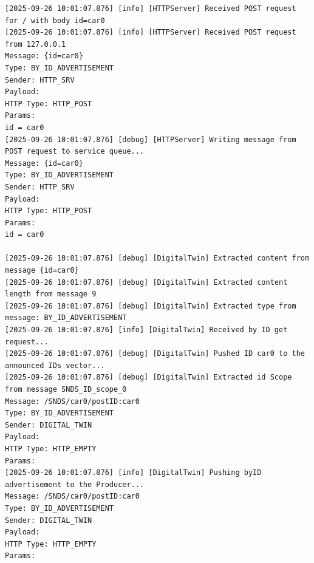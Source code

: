\documentclass{article}
\begin{document}
\begin{lstlisting}[language=log,caption={Publish \textit{@id=car0}},label={lst:local-publish-inside-a}]
[2025-09-26 10:01:07.876] [info] [HTTPServer] Received POST request for / with body id=car0
[2025-09-26 10:01:07.876] [info] [HTTPServer] Received POST request from 127.0.0.1
Message: {id=car0}
Type: BY_ID_ADVERTISEMENT
Sender: HTTP_SRV
Payload: 
HTTP Type: HTTP_POST
Params:
id = car0
[2025-09-26 10:01:07.876] [debug] [HTTPServer] Writing message from POST request to service queue...
Message: {id=car0}
Type: BY_ID_ADVERTISEMENT
Sender: HTTP_SRV
Payload: 
HTTP Type: HTTP_POST
Params:
id = car0

[2025-09-26 10:01:07.876] [debug] [DigitalTwin] Extracted content from message {id=car0}
[2025-09-26 10:01:07.876] [debug] [DigitalTwin] Extracted content length from message 9
[2025-09-26 10:01:07.876] [debug] [DigitalTwin] Extracted type from message: BY_ID_ADVERTISEMENT
[2025-09-26 10:01:07.876] [info] [DigitalTwin] Received by ID get request...
[2025-09-26 10:01:07.876] [debug] [DigitalTwin] Pushed ID car0 to the announced IDs vector...
[2025-09-26 10:01:07.876] [debug] [DigitalTwin] Extracted id Scope from message SNDS_ID_scope_0
Message: /SNDS/car0/postID:car0
Type: BY_ID_ADVERTISEMENT
Sender: DIGITAL_TWIN
Payload: 
HTTP Type: HTTP_EMPTY
Params:
[2025-09-26 10:01:07.876] [info] [DigitalTwin] Pushing byID advertisement to the Producer...
Message: /SNDS/car0/postID:car0
Type: BY_ID_ADVERTISEMENT
Sender: DIGITAL_TWIN
Payload: 
HTTP Type: HTTP_EMPTY
Params:


\end{lstlisting}
\end{document}

